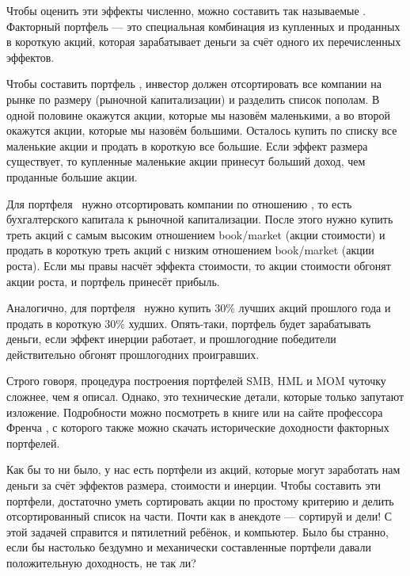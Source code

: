 Чтобы оценить эти эффекты численно, можно составить так называемые 
. Факторный портфель --- это 
специальная комбинация из купленных и проданных в короткую акций, которая 
зарабатывает деньги за счёт одного их перечисленных эффектов.

Чтобы составить портфель , инвестор должен 
отсортировать все компании на рынке по размеру (рыночной капитализации) и  
разделить список пополам. В одной половине окажутся акции, которые мы назовём 
маленькими, а во второй окажутся акции, которые мы назовём большими. Осталось 
купить по списку все маленькие акции и продать в короткую все большие. Если 
эффект размера существует, то купленные маленькие акции принесут больший доход, 
чем проданные большие акции.

Для портфеля \ нужно 
отсортировать компании по отношению , то есть бухгалтерского 
капитала к рыночной капитализации. После этого нужно купить треть акций с самым 
высоким отношением book/market (акции стоимости) и продать в короткую треть 
акций с низким отношением book/market (акции роста). Если мы правы насчёт 
эффекта стоимости, то акции стоимости обгонят акции роста, и портфель принесёт 
прибыль.

Аналогично, для портфеля \ нужно купить 30\% лучших акций 
прошлого года и продать в короткую 30\% худших. Опять-таки, портфель будет 
зарабатывать деньги, если эффект инерции работает, и прошлогодние победители 
действительно обгонят прошлогодних проигравших.

Строго говоря, процедура построения портфелей SMB, HML и MOM чуточку сложнее, 
чем я описал. Однако, это технические детали, которые только запутают изложение. 
Подробности можно посмотреть в книге \cite[ch.~9--11]{bali2016empirical} или на 
сайте профессора Френча \cite{kennethFrench}, с которого также можно скачать 
исторические доходности факторных портфелей.

Как бы то ни было, у нас есть портфели из акций, которые могут заработать нам 
деньги за счёт эффектов размера, стоимости и инерции. Чтобы составить эти 
портфели, достаточно уметь сортировать акции по простому критерию и делить
отсортированный список на части. Почти как в анекдоте --- сортируй и дели! С 
этой задачей справится и пятилетний ребёнок, и компьютер. Было бы странно, если 
бы настолько бездумно и механически составленные портфели давали положительную 
доходность, не так ли?

